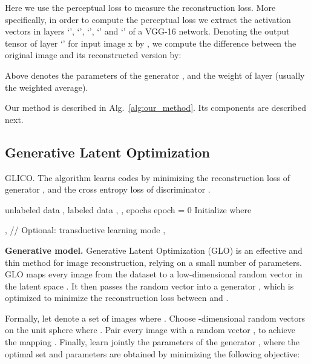 \documentclass[a4paper,conference]{IEEEtran}
\begin{document}
Here we use the perceptual loss \cite{johnson2016perceptual} to measure the reconstruction loss. More specifically, in order to compute the perceptual loss we extract the activation vectors in layers ‘’, ‘’, ‘’, ‘’ and ‘’ of a VGG-16 network. Denoting the output tensor of layer ‘’ for input image x by , we compute the difference between the original image and its reconstructed version by:

Above  denotes the parameters of the generator , and  the weight of layer  (usually the weighted average).

Our method is described in Alg.~\ref{alg:our_method}. Its components are described next.
\subsection{Generative Latent Optimization}
\label{sec:glo}


	
\begin{algorithm}[bt]
	\caption{GLICO. The algorithm learns codes  by minimizing the reconstruction loss  of generator , and the cross entropy loss  of discriminator .}
	\label{alg:our_method}
	\begin{algorithmic}
		 unlabeled data , labeled data , , epochs
		\STATE 
		\STATE epoch = 0
		\STATE Initialize  where 
		\REPEAT
														        
		\FOR{}
		\STATE 
		\STATE 
		\STATE 
		\STATE 
		\STATE {} 
		\STATE   , 
		\ENDFOR
		\STATE // Optional: transductive learning mode
		\FOR{}
		\STATE 
		\STATE {}    
		\STATE   , 
		\ENDFOR
		\STATE 
		\UNTIL{}
	\end{algorithmic}
\end{algorithm}

\textbf{Generative model.}
Generative Latent Optimization (GLO) 
is an effective and thin method for image reconstruction, relying on a small number of parameters. GLO maps every image  from the dataset to a low-dimensional random vector  in the latent space . It then passes the random vector into a generator , which is optimized to minimize the reconstruction loss between  and . 

Formally, let  denote a set of images where . Choose  -dimensional random vectors on the unit sphere  where . Pair every image  with a random vector , to achieve the mapping . Finally, learn jointly the parameters  of the generator , where the optimal set  and parameters  are obtained by minimizing the following objective:
\end{document}
